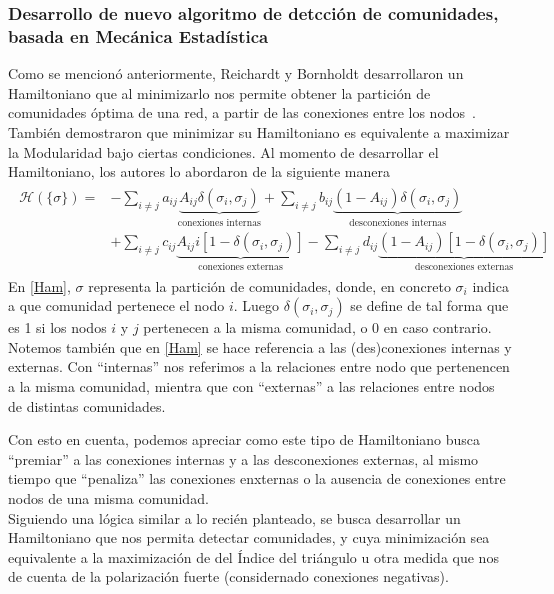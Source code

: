 \documentclass{proyectotesis}
\begin{document}
\subsubsection{Desarrollo de nuevo algoritmo de detcción de comunidades, basada en Mecánica Estadística} 
Como se mencionó anteriormente, Reichardt y Bornholdt desarrollaron un Hamiltoniano que al minimizarlo nos permite obtener la partición de comunidades óptima de una red, a partir de las conexiones entre los nodos~\cite{Reichardt_2006}. También demostraron que minimizar su Hamiltoniano es equivalente a maximizar la Modularidad bajo ciertas condiciones. 
Al momento de desarrollar el Hamiltoniano, los autores lo abordaron de la siguiente manera
\begin{align}
\begin{split}
    \mathcal{H}(\{\sigma\}) = &- \sum_{i\neq j} a_{ij}\underbrace{A_{ij}\delta(\sigma_i,\sigma_j)}_{\text{conexiones internas}} + \sum_{i\neq j} b_{ij}\underbrace{(1 - A_{ij})\delta(\sigma_i,\sigma_j)}_{\text{desconexiones internas}} \\
                              &+ \sum_{i\neq j} c_{ij} \underbrace{A_{ij}i[1 - \delta(\sigma_i,\sigma_j)] }_{\text{conexiones externas}} - \sum_{i\neq j} d_{ij} \underbrace{(1-A_{ij})[1 - \delta(\sigma_i,\sigma_j)]}_{\text{desconexiones externas}}
\end{split}
\label{Ham}
\end{align}
En \eqref{Ham}, $\sigma$ representa la partición de comunidades, donde, en concreto $\sigma_i$ indica a que comunidad pertenece el nodo $i$. Luego $\delta(\sigma_i,\sigma_j)$ se define de tal forma que es 1 si los nodos $i$ y $j$ pertenecen a la misma comunidad, o 0 en caso contrario. Notemos también que en \eqref{Ham} se hace referencia a las (des)conexiones internas y externas. Con ``internas'' nos referimos a la relaciones entre nodo que pertenencen a la misma comunidad, mientra que con ``externas'' a las relaciones entre nodos de distintas comunidades.

Con esto en cuenta, podemos apreciar como este tipo de Hamiltoniano busca ``premiar'' a las conexiones internas y a las desconexiones externas, al mismo tiempo que ``penaliza'' las conexiones enxternas o la ausencia de conexiones entre nodos de una misma comunidad.
\\

Siguiendo una lógica similar a lo recién planteado, se busca desarrollar un Hamiltoniano que nos permita detectar comunidades, y cuya minimización sea equivalente a la maximización de del Índice del triángulo u otra medida que nos de cuenta de la polarización fuerte (considernado conexiones negativas).
\end{document}
